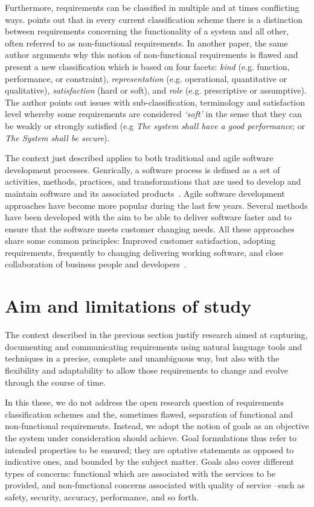 \documentclass[dissertation]{softeng}
\begin{document}
Furthermore, requirements can be classified in multiple and at times conflicting ways. \cite{Glinz:2007ehba} points out that in every current classification scheme there is a distinction between requirements concerning the functionality of a system and all other, often referred to as non-functional requirements. In another paper, the same author arguments why this notion of non-functional requirements is flawed and present a new classification which is based on four facets: \emph{kind} (e.g. function, performance, or constraint), \emph{representation} (e.g. operational, quantitative or qualitative), \emph{satisfaction} (hard or soft), and \emph{role} (e.g. prescriptive or assumptive). The author points out issues with sub-classification, terminology and satisfaction level whereby some requirements are considered \emph{`soft'} in the sense that they can be weakly or strongly satisfied (e.g \emph{The system shall have a good performance}; or \emph{The System shall be secure}). 

The context just described applies to both traditional and agile software development processes. Genrically, a software process is defined as a set of activities, methods, practices, and transformations that are used to develop and maintain software and its associated products~\cite{Cugola:1998htba}. Agile software development approaches have become more popular during the last few years. Several methods have been developed with the aim to be able to deliver software faster and to ensure that the software meets customer changing needs. All these approaches share some common principles: Improved customer satisfaction, adopting requirements, frequently to changing delivering working software, and close collaboration of business people and developers~\cite{Paetsch:2003tl}.

\section{Aim and limitations of study}
The context described in the previous section justify research aimed at capturing, documenting and communicating requirements using natural language tools and techniques in a precise, complete and unambiguous way, but also with the flexibility and adaptability to allow those requirements to change and evolve through the course of time.

In this these, we do not address the open research question of requirements classification schemes and the, sometimes flawed\cite{Glinz:2007ehba}, separation of functional and non-functional requirements. Instead, we adopt the notion of goals as an objective the system under consideration should achieve. Goal formulations thus refer to intended properties to be ensured; they are optative statements as opposed to indicative ones, and bounded by the subject matter. Goals also cover different types of concerns: functional which are associated with the services to be provided, and non-functional concerns associated with quality of service --such as safety, security, accuracy, performance, and so forth.\cite{Lamsweerde:2001wpba}
\end{document}
